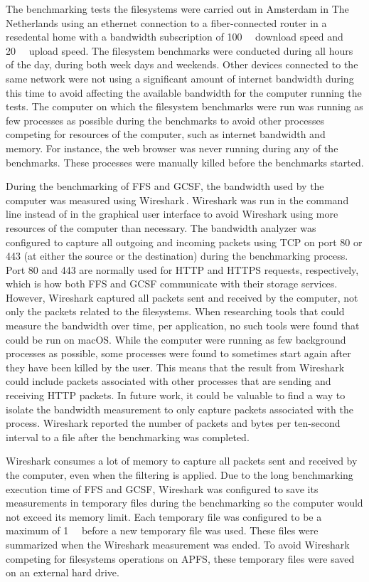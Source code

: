 The benchmarking tests the filesystems were carried out in Amsterdam in The Netherlands using an ethernet connection to a \mbox{fiber-connected} router in a resedental home with a bandwidth subscription of \SI{100}{\mega\bit} download speed and \SI{20}{\mega\bit} upload speed. The filesystem benchmarks were conducted during all hours of the day, during both week days and weekends. Other devices connected to the same network were not using a significant amount of internet bandwidth during this time to avoid affecting the available bandwidth for the computer running the tests. The computer on which the filesystem benchmarks were run was running as few processes as possible during the benchmarks to avoid other processes competing for resources of the computer, such as internet bandwidth and memory. For instance, the web browser was never running during any of the benchmarks. These processes were manually killed before the benchmarks started.

During the benchmarking of \gls{FFS} and \gls{GCSF}, the bandwidth used by the computer was measured using Wireshark\,\cite{WiresharkGoDeep}. Wireshark was run in the command line instead of in the graphical user interface to avoid Wireshark using more resources of the computer than necessary. The bandwidth analyzer was configured to capture all outgoing and incoming packets using TCP on port 80 or 443 (at either the source or the destination) during the benchmarking process. Port 80 and 443 are normally used for HTTP and HTTPS requests, respectively, which is how both \gls{FFS} and \gls{GCSF} communicate with their storage services. However, Wireshark captured all packets sent and received by the computer, not only the packets related to the filesystems. When researching tools that could measure the bandwidth over time, per application, no such tools were found that could be run on macOS. While the computer were running as few background processes as possible, some processes were found to sometimes start again after they have been killed by the user. This means that the result from Wireshark could include packets associated with other processes that are sending and receiving HTTP packets. In future work, it could be valuable to find a way to isolate the bandwidth measurement to only capture packets associated with the process. Wireshark reported the number of packets and bytes per ten-second interval to a file after the benchmarking was completed. 

Wireshark consumes a lot of memory to capture all packets sent and received by the computer, even when the filtering is applied. Due to the long benchmarking execution time of \gls{FFS} and \gls{GCSF}, Wireshark was configured to save its measurements in temporary files during the benchmarking so the computer would not exceed its memory limit. Each temporary file was configured to be a maximum of \SI{1}{\giga\byte} before a new temporary file was used. These files were summarized when the Wireshark measurement was ended. To avoid Wireshark competing for filesystems operations on \gls{APFS}, these temporary files were saved on an external hard drive.

